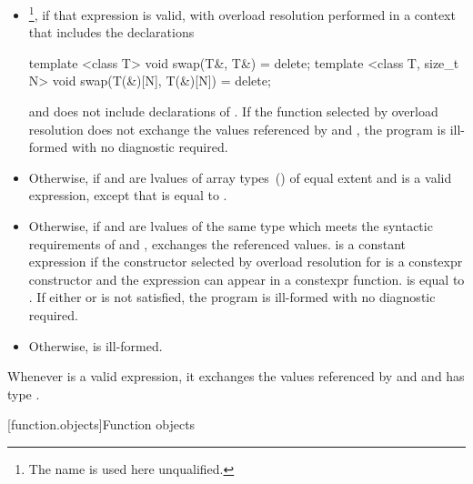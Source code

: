 \begin{itemize}
\item
  \footnote{The name  is used here unqualified.},
  if that expression is valid, with overload resolution performed in a context
  that includes the declarations
\begin{codeblock}
  template <class T>
  void swap(T&, T&) = delete;
  template <class T, size_t N>
  void swap(T(&)[N], T(&)[N]) = delete;
\end{codeblock}
  and does not include declarations of 
  .
  If the function selected by overload resolution does not
  exchange the values referenced by  and ,
  the program is ill-formed with no diagnostic required.

\item
  Otherwise,  if  and
   are lvalues of array types~()
  of equal extent and 
  is a valid expression, except that
   is equal to
  .

\item
  Otherwise, if  and  are lvalues of the
  same type  which meets the syntactic requirements of
   and
  , exchanges the referenced values.
   is a constant expression if
  the constructor selected by overload resolution for
   is a constexpr constructor and
  the expression  can appear in a
  constexpr function. 
  is equal to . If either
   or
   is not satisfied, the program
  is ill-formed with no diagnostic required.

\item
  Otherwise,  is ill-formed.
\end{itemize}

\pnum
\remark Whenever  is a valid
expression, it exchanges the values referenced by 
and  and has type .

\setcounter{section}{13}
[function.objects]{Function objects}

